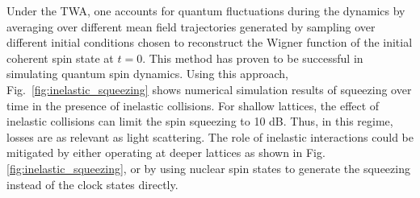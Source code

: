 \documentclass[aps,prx,superscriptaddress,notitlepage,twocolumn,longbibliography]{revtex4-1}
\begin{document}
Under the TWA, one accounts for quantum fluctuations during the dynamics by  averaging over different mean field trajectories generated by sampling over different initial conditions chosen to reconstruct the Wigner function of the initial coherent spin state at $t=0$\cite{rey2014probing}.
This method has proven to be successful in simulating quantum spin dynamics.
Using this approach, Fig.~\ref{fig:inelastic_squeezing} shows numerical simulation results of squeezing over time in the presence of inelastic collisions.
For shallow lattices, the effect of inelastic collisions can limit the spin squeezing to 10 dB.
Thus, in this regime, losses are as relevant as light scattering.
The role of inelastic interactions could be mitigated by either operating at deeper lattices as shown in Fig. \ref{fig:inelastic_squeezing}, or by using nuclear spin states to generate the squeezing instead of the clock states directly.



\end{document}
